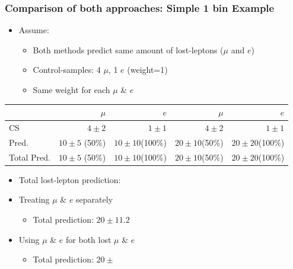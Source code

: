 \documentclass{beamer}
\begin{document}
\begin{frame}
  \frametitle{Comparison of both approaches: Simple 1 bin Example}
  \begin{itemize}
   \item Assume:
   \begin{itemize}
    \item Both methods predict same amount of lost-leptons ($\mu$ and $e$)
    \item Control-samples: 4 $\mu$, 1 $e$ (weight=1)
    \item Same weight for each $\mu$ \& $e$ 
   \end{itemize}

  \end{itemize}
  \scriptsize
  \begin{tabular}{l|r|r||r|r}

                                                  &           $\mu$            &           $e$  &             $\mu$            &           $e$  \\
\midrule 
     CS &                $4\pm2$ &             $1\pm1$ &              $4\pm2$ &             $1\pm1$  \\ \hline
      Pred.    &          $10\pm5$ (50\%) &              $10\pm10$(100\%)&              $20\pm10$(50\%)&                 $20\pm20$(100\%) \\
      Total Pred. &      $10\pm5$ (50\%) &              $10\pm10$(100\%)&              $20\pm10$(50\%)&                 $20\pm20$(100\%) \\
\bottomrule
\end{tabular}
\begin{itemize}
 \item Total lost-lepton prediction:
 \item Treating $\mu$ \& $e$ separately
 \begin{itemize}
  \item Total prediction: $20\pm11.2$
 \end{itemize}
 \item Using $\mu$ \& $e$ for both lost $\mu$ \& $e$
 \begin{itemize}
  \item Total prediction: $20\pm$
 \end{itemize}


\end{itemize}




\end{frame}
\end{document}
